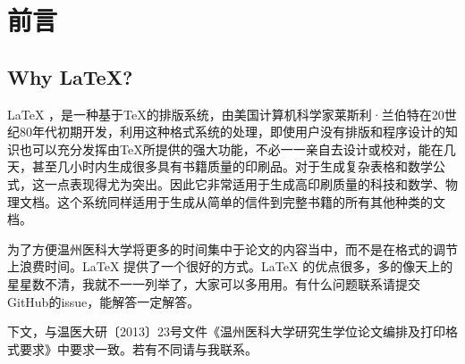 \chapter{前\qquad 言}
\section{Why \LaTeX ? }
\LaTeX{} ，是一种基于\TeX{}的排版系统，由美国计算机科学家莱斯利·兰伯特在20世纪80年代初期开发，利用这种格式系统的处理，即使用户没有排版和程序设计的知识也可以充分发挥由\TeX{}所提供的强大功能，不必一一亲自去设计或校对，能在几天，甚至几小时内生成很多具有书籍质量的印刷品。对于生成复杂表格和数学公式，这一点表现得尤为突出。因此它非常适用于生成高印刷质量的科技和数学、物理文档。这个系统同样适用于生成从简单的信件到完整书籍的所有其他种类的文档。

为了方便温州医科大学将更多的时间集中于论文的内容当中，而不是在格式的调节上浪费时间。\LaTeX{} 提供了一个很好的方式。\LaTeX{} 的优点很多，多的像天上的星星数不清，我就不一一列举了，大家可以多用用。有什么问题联系请提交GitHub的issue，能解答一定解答。
\par 下文，与温医大研〔2013〕23号文件《温州医科大学研究生学位论文编排及打印格式要求》中要求一致。若有不同请与我联系。

